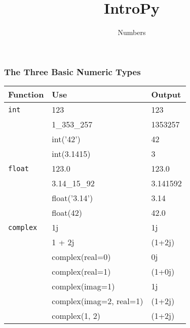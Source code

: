\documentclass{beamer}
\title{IntroPy}
\subtitle{Numbers}
\begin{document}
\frame{\titlepage}

\begin{frame}
  \frametitle{The Three Basic Numeric Types}

  \begin{table}
    \begin{tabular}{l | l | l}
    Function & Use         & Output   \\
    \hline
    \texttt{int}      & 123         & 123      \\
                      & 1\_353\_257 & 1353257  \\
                      & int('42')   & 42       \\
                      & int(3.1415) & 3        \\
    \hline
    \texttt{float}    & 123.0         & 123.0   \\
		      & 3.14\_15\_92  & 3.141592\\
                      & float('3.14') & 3.14    \\
                      & float(42)     & 42.0    \\
    \hline
    \texttt{complex}  & 1j                      & 1j    \\
                      & 1 + 2j                  & (1+2j)\\
                      & complex(real=0)         & 0j    \\
                      & complex(real=1)         & (1+0j)\\
                      & complex(imag=1)         & 1j    \\
                      & complex(imag=2, real=1) & (1+2j)\\
                      & complex(1, 2)           & (1+2j)
     \end{tabular}
  \end{table}
  
\end{frame}
\end{document}
